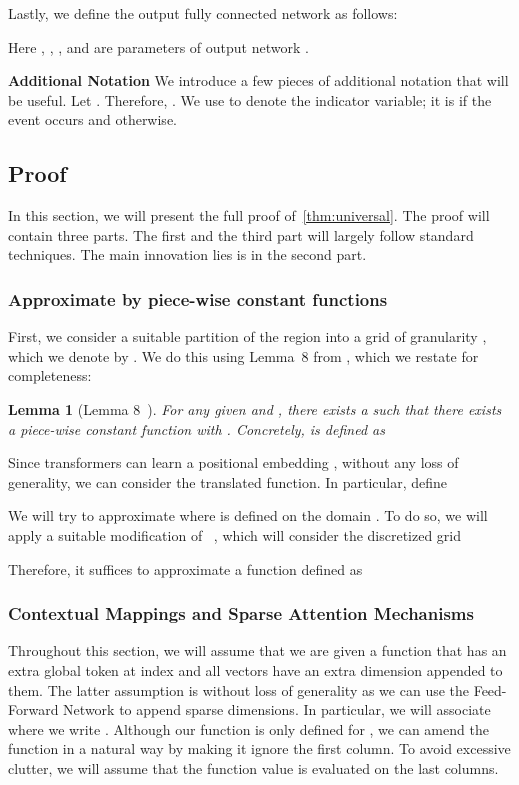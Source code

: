 \documentclass{article}
\newtheorem{lemma}{Lemma}
\begin{document}
Lastly, we define the output fully connected network as follows:

Here , , , and  are parameters of 
output network . 

\textbf{Additional Notation} We introduce a few pieces of additional notation that will be useful. 
Let . Therefore,
. 
We use  to denote the indicator variable; it is  if the event  occurs and  otherwise. 

\subsection{Proof}
In this section, we will present the full proof of~\cref{thm:universal}. 
The proof will contain three parts. 
The first and the third part will largely follow standard techniques. The main innovation lies is in the second part. 


\subsubsection{Approximate \texorpdfstring{}{Fcd} by piece-wise constant functions}
    First, we consider a suitable partition of the region  into a 
    grid of granularity , which we denote by .  We do this using Lemma~8 from \citet{Yun19}, which we restate for completeness:
    \begin{lemma}[Lemma 8~\citep{Yun19}] \label{lem:piecewise}
       For any given  and , there exists a  such that
        there exists a piece-wise constant function  with . 
         Concretely,  is defined as 
     
    \end{lemma}

    Since transformers can learn a positional embedding , without any loss of generality, 
    we can consider the translated function. In particular, define
     
    
    We will try to approximate  where  is defined on the domain 
    . To do so, we will apply a suitable modification of ~,
    which will consider the discretized grid 
     
    
    Therefore, it suffices to approximate a function  
   defined as  
     

\subsubsection{Contextual Mappings and Sparse Attention Mechanisms}

Throughout this section, we will assume that we are given a function that has an extra global token 
at index  and all vectors have an extra dimension appended to them. The latter assumption is  
without loss of generality as we can use the Feed-Forward Network to append sparse dimensions. 
In particular, we will associate  where we write . 
Although our function is only defined for , 
we can amend the function in a natural way by making it ignore the first column. 
To avoid excessive clutter, we will assume that the function value is evaluated on the last  columns. 
\end{document}
